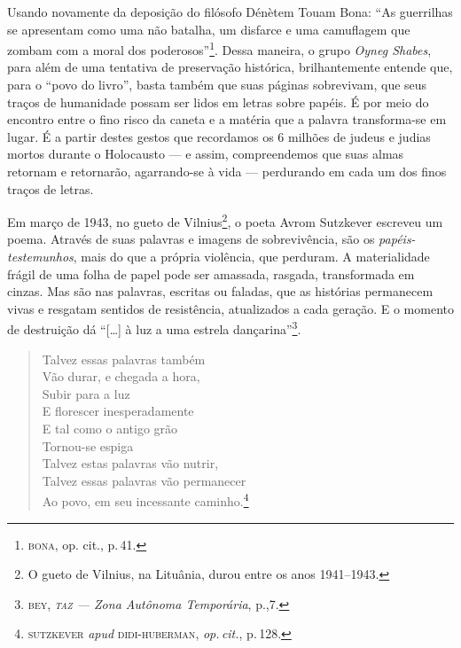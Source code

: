 
Usando novamente da deposição do filósofo Dénètem Touam Bona: ``As
guerrilhas se apresentam como uma não batalha, um disfarce e uma
camuflagem que zombam com a moral dos poderosos''\footnote{\textsc{bona}, op.
  cit., p.\,41.}. Dessa maneira, o grupo \emph{Oyneg Shabes}, para além
de uma tentativa de preservação histórica, brilhantemente entende que,
para o ``povo do livro'', basta também que suas páginas
sobrevivam, que seus traços de humanidade possam ser lidos em letras
sobre papéis. É por meio do encontro entre o fino risco da caneta e a
matéria que a palavra transforma-se em lugar. É a partir destes gestos
que recordamos os 6 milhões de judeus e judias mortos durante o
Holocausto --- e assim, compreendemos que suas almas retornam e
retornarão, agarrando-se à vida --- perdurando em cada um dos finos
traços de letras.

\begin{center}\end{center}

Em março de 1943, no gueto de Vilnius\footnote{O gueto de Vilnius,
  na Lituânia, durou entre os anos 1941--1943.}, o poeta Avrom Sutzkever escreveu um poema. Através de suas palavras e imagens de sobrevivência, são os \emph{papéis-testemunhos}, mais do que a própria violência, que perduram. A materialidade frágil de uma folha de papel pode ser amassada, rasgada, transformada em cinzas. Mas são nas palavras, escritas ou faladas, que as histórias permanecem vivas e resgatam sentidos de resistência, atualizados a cada geração. E o momento de destruição dá ``{[}\ldots{}{]} à luz a uma estrela dançarina''\footnote{\textsc{bey}, \emph{\textsc{taz} --- Zona Autônoma Temporária}, p.,7.}. 


\begin{verse}
Talvez essas palavras também\\
Vão durar, e chegada a hora,\\
Subir para a luz\\
E florescer inesperadamente\\
E tal como o antigo grão\\
Tornou-se espiga\\
Talvez estas palavras vão nutrir,\\
Talvez essas palavras vão permanecer\\
Ao povo, em seu incessante caminho.\footnote{\textsc{sutzkever} \emph{apud}
  \textsc{didi-huberman}, \emph{op.\,cit.}, p.\,128.}
\end{verse} 

